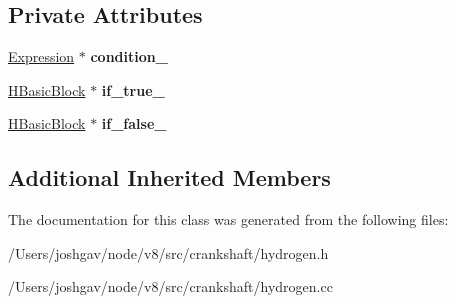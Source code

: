\subsection*{Private Attributes}
\begin{DoxyCompactItemize}
\item 
\hyperlink{classv8_1_1internal_1_1_expression}{Expression} $\ast$ {\bfseries condition\+\_\+}\hypertarget{classv8_1_1internal_1_1_test_context_a671a8a6cbdd5cd94fced6019499de99b}{}\label{classv8_1_1internal_1_1_test_context_a671a8a6cbdd5cd94fced6019499de99b}

\item 
\hyperlink{classv8_1_1internal_1_1_h_basic_block}{H\+Basic\+Block} $\ast$ {\bfseries if\+\_\+true\+\_\+}\hypertarget{classv8_1_1internal_1_1_test_context_ae596001a7759cc0cfaa041ff47cce9af}{}\label{classv8_1_1internal_1_1_test_context_ae596001a7759cc0cfaa041ff47cce9af}

\item 
\hyperlink{classv8_1_1internal_1_1_h_basic_block}{H\+Basic\+Block} $\ast$ {\bfseries if\+\_\+false\+\_\+}\hypertarget{classv8_1_1internal_1_1_test_context_a36a034f90f1ef505a712463866f7c606}{}\label{classv8_1_1internal_1_1_test_context_a36a034f90f1ef505a712463866f7c606}

\end{DoxyCompactItemize}
\subsection*{Additional Inherited Members}


The documentation for this class was generated from the following files\+:\begin{DoxyCompactItemize}
\item 
/\+Users/joshgav/node/v8/src/crankshaft/hydrogen.\+h\item 
/\+Users/joshgav/node/v8/src/crankshaft/hydrogen.\+cc\end{DoxyCompactItemize}

